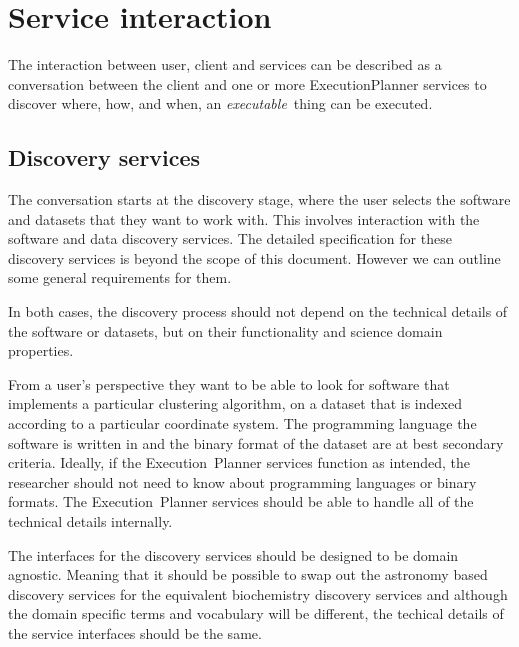 \documentclass[11pt,a4paper]{ivoa}
\newcommand{\execplanner} {ExecutionPlanner}
\newcommand{\executionplanner} {Execution~Planner}
\newcommand{\dataset} {dataset}
\newcommand{\executablething} {\textit{executable}~thing}
\begin{document}
\section{Service interaction}
\label{service-interaction}

The interaction between user, client and services can be described as a conversation between the client
and one or more \execplanner{} services to discover where, how, and when, an \executablething{} can be
executed.

\subsection{Discovery services}
\label{discovery-services}

The conversation starts at the discovery stage, where the user selects the software and
\dataset{}s that they want to work with.
This involves interaction with the software and data discovery services.
The detailed specification for these discovery services is beyond the scope of this document.
However we can outline some general requirements for them.

In both cases, the discovery process should not depend on the technical details
of the software or \dataset{}s, but on their functionality and science domain properties.

From a user's perspective they want to be able to look for software that implements
a particular clustering algorithm, on a \dataset{} that is indexed according to a particular
coordinate system.
The programming language the software is written in and the binary format of the \dataset{}
are at best secondary criteria.
Ideally, if the \executionplanner{} services function as intended, the researcher should not
need to know about programming languages or binary formats.
The \executionplanner{} services should be able to handle all of the technical details
internally.

The interfaces for the discovery services should be designed to be domain agnostic.
Meaning that it should be possible to swap out the astronomy based discovery services
for the equivalent biochemistry discovery services and although the domain specific
terms and vocabulary will be different, the techical details of the service interfaces
should be the same.
\end{document}
